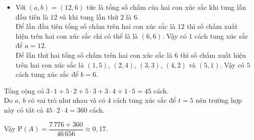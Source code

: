 \begin{ex}
{\begin{enumerate}[TH1:]
\begin{itemize}
				\item Với $(a,b)=(12,6)$ tức là tổng số chấm của hai con xúc sắc khi tung lần đầu tiên là $12$ và khi tung lần thứ $2$ là $6$.\\ Để lần đầu tiên tổng số chấm trên hai con xúc sắc là $12$ thì số chấm xuất hiện trên hai con xúc sắc chỉ có thể là là $(6,6)$. Vậy có $1$ cách tung xúc sắc để $a=12$. \\Để lần thứ hai tổng số chấm trên hai con xúc sắc là $6$ thì số chấm xuất hiện trên hai con xúc sắc là $(1,5)$, $(2,4)$, $(3,3)$, $(4,2)$ và $ (5,1)$. Vậy có $5$ cách tung xúc sắc để $b=6$.
			\end{itemize}
			Tổng cộng có $3\cdot1+5\cdot2+5\cdot3+3\cdot4+1\cdot5=45$ cách.\\
			Do $a$, $b$ có vai trò như nhau và  có $4$ cách tung xúc sắc để $t=5$ nên trường hợp này có tất cả $45\cdot2\cdot4=360$ cách.
		\end{enumerate}  
		Vậy $\mathrm{P}(A)=\dfrac{7\,776+360}{46\,656}\approx 0{,}17$. 
	}
\end{ex}



